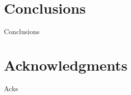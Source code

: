 \documentclass{anstrans}
\begin{document}
\section{Conclusions}
Conclusions

\section{Acknowledgments}
Acks



\end{document}
